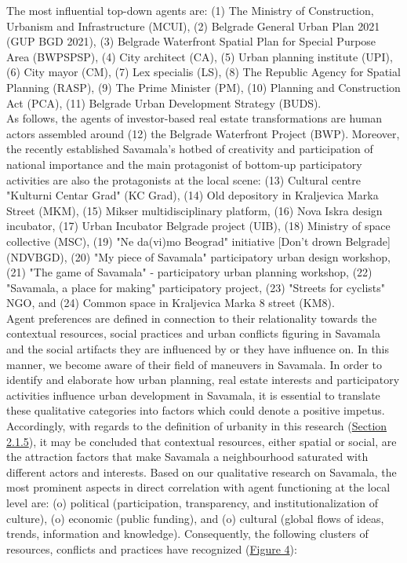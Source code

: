 \documentclass[11pt]{report}
\begin{document}
The most influential top-down agents are: 
(1) The Ministry of Construction, Urbanism and Infrastructure (MCUI),
(2) Belgrade General Urban Plan 2021 (GUP BGD 2021),
(3) Belgrade Waterfront Spatial Plan for Special Purpose Area (BWPSPSP), 
(4) City architect (CA),
(5) Urban planning institute (UPI),
(6) City mayor (CM),
(7) Lex specialis (LS),
(8) The Republic Agency for Spatial Planning (RASP),
(9) The Prime Minister (PM),
(10) Planning and Construction Act (PCA),
(11) Belgrade Urban Development Strategy (BUDS).
\\

As follows, the agents of investor-based real estate transformations are human actors assembled around
(12) the Belgrade Waterfront Project (BWP). Moreover, the recently established Savamala's hotbed of creativity and participation of national importance and the main protagonist of bottom-up participatory activities are also the protagonists at the local scene: 
(13) Cultural centre "Kulturni Centar Grad" (KC Grad),
(14) Old depository in Kraljevica Marka Street (MKM),
(15) Mikser multidisciplinary platform,
(16) Nova Iskra design incubator,
(17) Urban Incubator Belgrade project (UIB),
(18) Ministry of space collective (MSC),
(19) "Ne da(vi)mo Beograd" initiative [Don't drown Belgrade] (NDVBGD),
(20) "My piece of Savamala" participatory urban design workshop,
(21) "The game of Savamala" - participatory urban planning workshop,
(22) "Savamala, a place for making" participatory project,
(23) "Streets for cyclists" NGO,
and
(24) Common space in Kraljevica Marka 8 street (KM8).
\\

Agent preferences are defined in connection to their relationality towards the contextual resources, social practices and urban conflicts figuring in Savamala and the social artifacts they are influenced by or they have influence on.
In this manner, we become aware of their field of maneuvers in Savamala.
In order to identify and elaborate how urban planning, real estate interests and participatory activities influence urban development in Savamala, it is essential to translate these qualitative categories into factors which could denote a positive impetus.
\\

Accordingly, with regards to the definition of urbanity in this research (\href{Section 2.1.5}{Section 2.1.5}), it may be concluded that contextual resources, either spatial or social, are the attraction factors that make Savamala a neighbourhood saturated with different actors and interests.
Based on our qualitative research on Savamala, the most prominent aspects in direct correlation with agent functioning at the local level are:
(o) political (participation, transparency, and institutionalization of culture),
(o) economic (public funding),
and
(o) cultural (global flows of ideas, trends, information and knowledge).
Consequently, the following clusters of resources, conflicts and practices have recognized (\href{Figure 4}{Figure 4}):
\end{document}
